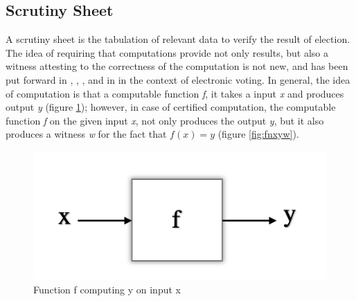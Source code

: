   
    
%   
%   	
%    
%    
%		
%	  
%       
       
%       
%     
%   	 
  
	       
    
   \subsection{Scrutiny Sheet}
   A scrutiny sheet is the tabulation of relevant data to verify the result of election. 
   The idea of requiring that computations provide not only results, but also a witness attesting
    to the correctness of the computation is not new,
	and has been put forward in \citep{89397},  
	\citep{MCCONNELL2011119},
	\citep{Arkoudas:2005:DRC}, and in \citep{Schurmann:2009:EET} in the context
	of electronic voting.   In general, the idea of computation is that a computable function \textit{f}, it takes 
	a input \textit{x} and produces output \textit{y} (figure \ref{fig:fnxy}); however, in case of
	 certified computation, 
	the computable function \textit{f} on the given input \textit{x}, not only produces the output \textit{y},
	but it also produces a witness \textit{w} for the fact that $ f (x) = y$ (figure \ref{fig:fnxyw}).
	
	\begin{figure}[h!]
	\centering
  \includegraphics[width=0.5\linewidth]{figs/function_fx.png}
  \caption{Function f computing y on input x}
  \label{fig:fnxy}
  \end{figure} 
  
